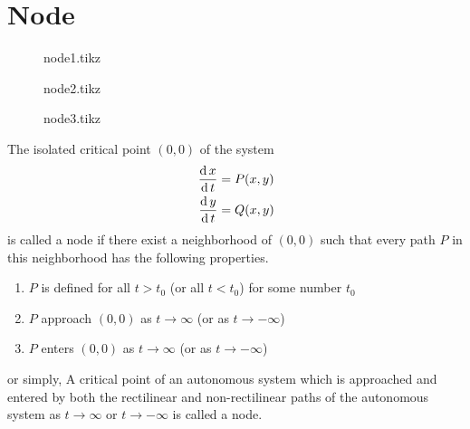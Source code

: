 \documentclass[../main-sheet.tex]{subfiles}
\begin{document}
\section{Node}
\begin{figure}[H]
    \centering
    \begin{minipage}[c]{.3\textwidth}
        {node1.tikz}
    \end{minipage}
    \begin{minipage}[c]{.3\textwidth}
        {node2.tikz}
    \end{minipage}
    \begin{minipage}[c]{.3\textwidth}
        {node3.tikz}
    \end{minipage}
\end{figure}
The isolated critical point \((0,0)\) of the system
\begin{align*}
    \,\frac{\mathrm{d}\,x}{\mathrm{d}\,t}&=P(x,y)\\
    \,\frac{\mathrm{d}\,y}{\mathrm{d}\,t}&=Q(x,y)
\end{align*}
is called a node if there exist a neighborhood of \((0,0)\) such that every path \(P\) in this neighborhood has the following properties.
\begin{enumerate}[label=(\roman*)]
    \item \(P\) is defined for all \(t>t_0\) (or all \(t<t_0\)) for some number \(t_0\)
    \item \(P\) approach \((0,0)\) as \(t\to\infty\) (or as \(t\to-\infty\))
    \item \(P\) enters \((0,0)\) as \(t\to\infty\) (or as \(t\to-\infty\))
\end{enumerate}
or simply, A critical point of an autonomous system which is approached and entered by both the rectilinear and non-rectilinear paths of the autonomous system as \(t\to \infty\) or \(t\to -\infty\) is called a node.
\end{document}
